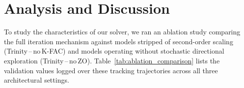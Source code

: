 \documentclass[conference]{IEEEtran}
\begin{document}
\section{Analysis and Discussion}
\label{sec:analysis}


To study the characteristics of our solver, we ran an ablation study comparing the full iteration mechanism against models stripped of second-order scaling (Trinity\,--\,no\,K-FAC) and models operating without stochastic directional exploration (Trinity\,--\,no\,ZO).
Table~\ref{tab:ablation_comparison} lists the validation values logged over these tracking trajectories across all three architectural
settings.



\end{document}
